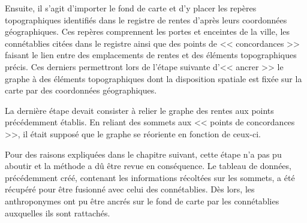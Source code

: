 Ensuite, il s'agit d'importer le fond de carte et d'y placer les repères topographiques identifiés dans le registre de rentes d'après leurs coordonnées géographiques. Ces repères comprennent les portes et enceintes de la ville, les connétablies citées dans le registre ainsi que des points de << concordances >> faisant le lien entre des emplacements de rentes et des éléments topographiques précis. Ces derniers permettront lors de l'étape suivante d'<< ancrer >> le graphe à des éléments topographiques dont la disposition spatiale est fixée sur la carte par des coordonnées géographiques.

La dernière étape devait consister à relier le graphe des rentes aux points précédemment établis. En reliant des sommets aux << points de concordances >>, il était supposé que le graphe se réoriente en fonction de ceux-ci. 

Pour des raisons expliquées dans le chapitre suivant, cette étape n'a pas pu aboutir et la méthode a dû être revue  en conséquence.
Le tableau de données, précédemment créé, contenant les informations récoltées sur les sommets, a été récupéré pour être fusionné avec celui des connétablies. Dès lors, les anthroponymes ont pu être ancrés sur le fond de carte  par les connétablies auxquelles ils sont rattachés.
